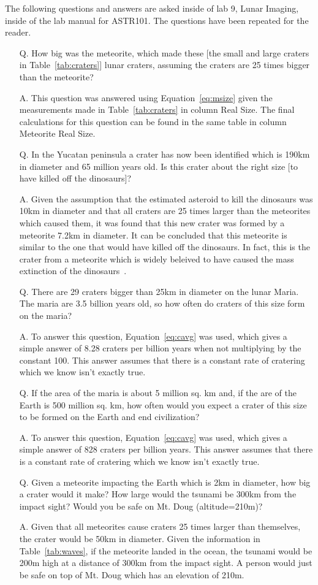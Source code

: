 \documentclass{article}
\begin{document}
The following questions and answers are asked inside of lab 9, Lunar Imaging, inside of the lab manual
for ASTR101. The questions have been repeated for the reader.

\begin{enumerate}
\item[Q.] How big was the meteorite, which made these [the small and large craters in Table~\ref{tab:craters}]
lunar craters, assuming the craters are 25 times bigger than the meteorite?
\item[A.] This question was answered using Equation~\ref{eq:msize} given the measurements made in Table~\ref{tab:craters}
in column Real Size. The final calculations for this question can be found in the same table in column 
Meteorite Real Size.
\item[Q.] In the Yucatan peninsula a crater has now been identified which is 190km in diameter and 65 million years old.
 Is this crater about the right size [to have killed off the dinosaurs]?
\item[A.] Given the assumption that the estimated asteroid to kill the dinosaurs was 10km in diameter and that all
craters are 25 times larger than the meteorites which caused them, it was found that this new crater was formed
by a meteorite 7.2km in diameter. It can be concluded that this meteorite is similar to the one that would
have killed off the dinosaurs.  In fact, this is the crater from a meteorite which is widely beleived to have
caused the mass extinction of the dinosaurs~\cite{Bates:1992}.
\item[Q.] There are 29 craters bigger than 25km in diameter on the lunar Maria. The maria are 3.5 billion years
old, so how often do craters of this size form on the maria?
\item[A.] To answer this question, Equation~\ref{eq:cavg} was used, which gives a simple answer of 8.28 craters per
billion years when not multiplying by the constant 100. This answer assumes that there is a constant rate
of cratering which we know isn't exactly true.
\item[Q.] If the area of the maria is about 5 million sq. km and, if the are of the Earth is 500 million sq. km, how 
often would you expect a crater of this size to be formed
on the Earth and end civilization?
\item[A.]  To answer this question, Equation~\ref{eq:cavg} was used, which gives a simple answer of 828 craters per
billion years. This answer assumes that there is a constant rate of cratering which we know isn't exactly true.
\item [Q.] Given a meteorite impacting the Earth which is 2km in diameter, how big a crater would it make?
How large would the tsunami be 300km from the impact sight?
Would you be safe on Mt. Doug (altitude=210m)?
\item [A.] Given that all meteorites cause craters 25 times larger than themselves, the crater would be 50km 
in diameter. Given the information in Table~\ref{tab:waves}, if the meteorite landed in the ocean, the 
tsunami would be 200m high at a distance of 300km from the impact sight. A person would just be safe on
top of Mt. Doug which has an elevation of 210m.
\end{enumerate}
\end{document}
